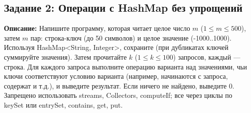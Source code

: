 \documentclass[12pt]{article}
\begin{document}
\subsection{Задание 2: Операции с HashMap без упрощений}
  \textbf{Описание:} Напишите программу, которая читает целое число $m$ ($1 \leq m \leq 500$), затем $m$ пар: строка-ключ (до 50 символов) и целое значение (-1000..1000). Используя HashMap<String, Integer>, сохраните (при дубликатах ключей суммируйте значения). Затем прочитайте $k$ ($1 \leq k \leq 100$) запросов, каждый — строка. Для каждого запроса выполните операцию варианта над значениями, чьи ключи соответствуют условию варианта (например, начинаются с запроса, содержат и т.д.), и выведите результат. Если ничего не найдено, выведите 0. Запрещено использовать streams, Collectors, computeIf; все через циклы по keySet или entrySet, contains, get, put.
\end{document}
